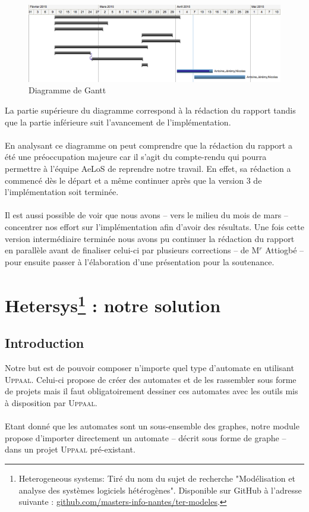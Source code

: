 \documentclass[12pt,a4paper]{report}
\begin{document}
\begin{figure}[!h]
  \centering
  \includegraphics[scale=0.4]{ressources/gantt.png}
  \caption{Diagramme de Gantt}
\end{figure}

La partie supérieure du diagramme correspond à la rédaction du rapport
tandis que la partie inférieure suit l'avancement de l'implémentation.
\\\\
En analysant ce diagramme on peut comprendre que la rédaction du rapport a été
une préoccupation majeure car il s'agit du compte-rendu qui pourra permettre 
à l'équipe AeLoS de reprendre notre travail. En effet, sa rédaction a commencé dès
le départ et a même continuer après que la version 3 de l'implémentation soit terminée.
\\\\
Il est aussi possible de voir que nous avons -- vers le milieu du mois de mars -- concentrer
nos effort sur l'implémentation afin d'avoir des résultats. Une fois cette version intermédiaire
terminée nous avons pu continuer la rédaction du rapport en parallèle avant de 
finaliser celui-ci par plusieurs corrections -- de M$^r$ Attiogbé -- pour ensuite passer à l'élaboration 
d'une présentation pour la soutenance.


\newpage
\chapter[Hetersys : notre solution]{Hetersys\footnote{Heterogeneous systems: Tiré du nom du sujet de recherche "Modélisation et analyse des systèmes logiciels hétérogènes". Disponible sur GitHub à l'adresse suivante : \href{https://github.com/masters-info-nantes/ter-modeles}{github.com/masters-info-nantes/ter-modeles}.} : notre solution}
\section{Introduction}

Notre but est de pouvoir composer n'importe quel type d'automate en utilisant 
\textsc{Uppaal}. Celui-ci propose de créer des automates et de les rassembler sous forme de projets 
mais il faut obligatoirement dessiner ces automates avec les outils mis à disposition
par \textsc{Uppaal}.
\\\\
Etant donné que les automates sont un sous-ensemble des graphes, notre module propose 
d'importer directement un automate -- décrit sous forme de graphe -- dans un projet 
\textsc{Uppaal} pré-existant. 
\end{document}
